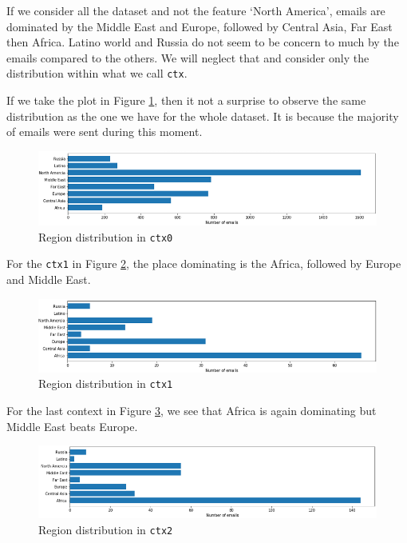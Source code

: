 \documentclass[11pt]{article}
\begin{document}
If we consider all the dataset and not the feature `North America', emails are dominated by the Middle East and Europe, followed by Central Asia, Far East then Africa. Latino world and Russia do not seem to be concern to much by the emails compared to the others. We will neglect that and consider only the distribution within what we call \texttt{ctx}. 

If we take the plot in Figure \ref{fig:emails_map_distribution_ctx0}, then it not a surprise to observe the same distribution as the one we have for the whole dataset. It is because the majority of emails were sent during this moment.

\begin{figure}[h]
	\centering
	\includegraphics[width=\linewidth]{images/emails_map_ctx0.png}
	\caption{Region distribution in \texttt{ctx0}}
	\label{fig:emails_map_distribution_ctx0}
\end{figure}

For the \texttt{ctx1} in Figure \ref{fig:emails_map_distribution_ctx1}, the place dominating is the Africa, followed by Europe and Middle East.

\begin{figure}[h]
	\centering
	\includegraphics[width=\linewidth]{images/emails_map_ctx1.png}
	\caption{Region distribution in \texttt{ctx1}}
	\label{fig:emails_map_distribution_ctx1}
\end{figure}

For the last context in Figure \ref{fig:emails_map_distribution_ctx2}, we see that Africa is again dominating but Middle East beats Europe.

\begin{figure}[h]
	\centering
	\includegraphics[width=\linewidth]{images/emails_map_ctx2.png}
	\caption{Region distribution in \texttt{ctx2}}
	\label{fig:emails_map_distribution_ctx2}
\end{figure}
\end{document}
